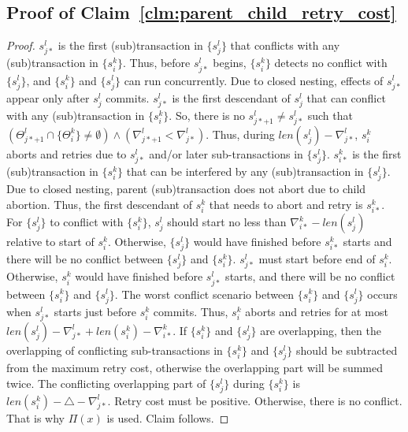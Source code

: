 \documentclass[letter]{sig-alternate}
\begin{document}
\subsection{\label{proof_clm:parent_child_retry_cost}Proof of Claim~\ref{clm:parent_child_retry_cost}}

\begin{proof}

$s_{j*}^{l}$ is the first (sub)transaction in $\{s_{j}^{l}\}$ that
conflicts with any (sub)transaction in $\{s_{i}^{k}\}$. Thus, before
$s_{j*}^{l}$ begins, $\{s_{i}^{k}\}$ detects no conflict with $\{s_{j}^{l}\}$,
and $\{s_{i}^{k}\}$ and $\{s_{j}^{l}\}$ can run concurrently. Due
to closed nesting, effects of $s_{j*}^{l}$ appear only after $s_{j}^{l}$
commits. $s_{j*}^{l}$ is the first descendant of $s_{j}^{l}$ that
can conflict with any (sub)transaction in $\{s_{i}^{k}\}$. So, there
is no $s_{j*+1}^{l}\neq s_{j*}^{l}$ such that $\left(\Theta_{j*+1}^{l}\cap\{\Theta_{i}^{k}\}\neq\emptyset\right)\wedge\left(\nabla_{j*+1}^{l}<\nabla_{j*}^{l}\right)$.
Thus, during $len(s_{j}^{l})-\nabla_{j*}^{l}$, $s_{i}^{k}$ aborts
and retries due to $s_{j*}^{l}$ and/or later sub-transactions in
$\{s_{j}^{l}\}$. $s_{i*}^{k}$ is the first (sub)transaction in $\{s_{i}^{k}\}$
that can be interfered by any (sub)transaction in $\{s_{j}^{l}\}$.
Due to closed nesting, parent (sub)transaction does not abort due
to child abortion. Thus, the first descendant of $s_{i}^{k}$ that
needs to abort and retry is $s_{i*}^{k}$. For $\{s_{j}^{l}\}$ to
conflict with $\{s_{i}^{k}\}$, $s_{j}^{l}$ should start no less
than $\nabla_{i*}^{k}-len\left(s_{j}^{l}\right)$ relative to start
of $s_{i}^{k}$. Otherwise, $\{s_{j}^{l}\}$ would have finished before
$s_{i*}^{k}$ starts and there will be no conflict between $\{s_{j}^{l}\}$
and $\{s_{i}^{k}\}$. $s_{j*}^{l}$ must start before end of $s_{i}^{k}$.
Otherwise, $s_{i}^{k}$ would have finished before $s_{j*}^{l}$ starts,
and there will be no conflict between $\{s_{i}^{k}\}$ and $\{s_{j}^{l}\}$.
The worst conflict scenario between $\{s_{i}^{k}\}$ and $\{s_{j}^{l}\}$
occurs when $s_{j*}^{l}$ starts just before $s_{i}^{k}$ commits.
Thus, $s_{i}^{k}$ aborts and retries for at most $len(s_{j}^{l})-\nabla_{j*}^{l}+len(s_{i}^{k})-\nabla_{i*}^{k}$.
If $\{s_{i}^{k}\}$ and $\{s_{j}^{l}\}$ are overlapping, then the
overlapping of conflicting sub-transactions in $\{s_{i}^{k}\}$ and
$\{s_{j}^{l}\}$ should be subtracted from the maximum retry cost,
otherwise the overlapping part will be summed twice. The conflicting
overlapping part of $\{s_{j}^{l}\}$ during $\{s_{i}^{k}\}$ is $len(s_{i}^{k})-\triangle-\nabla_{j*}^{l}$.
Retry cost must be positive. Otherwise, there is no conflict. That
is why $\Pi(x)$ is used. Claim follows.

\end{proof}
\end{document}
